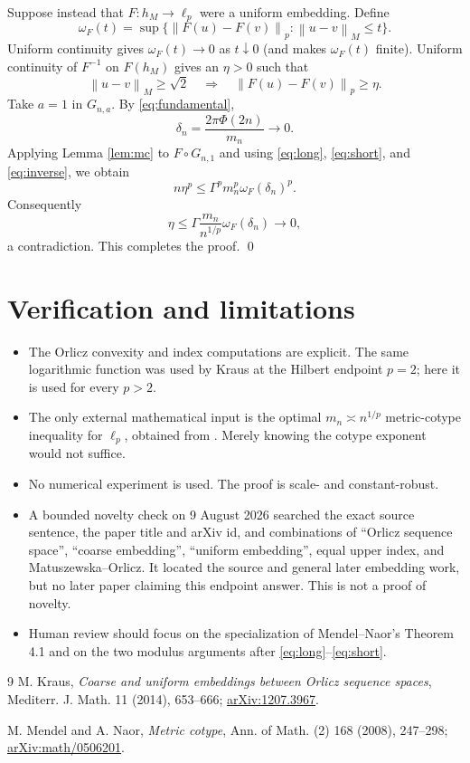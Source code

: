 \documentclass[11pt]{article}
\newcommand{\norm}[1]{\left\lVert #1\right\rVert}
\begin{document}
Suppose instead that $F:h_M\to\ell_p$ were a uniform embedding.  Define
\[
 \omega_F(t)=\sup\{\norm{F(u)-F(v)}_p:\norm{u-v}_M\le t\}.
\]
Uniform continuity gives $\omega_F(t)\to0$ as $t\downarrow0$ (and makes
$\omega_F(t)$ finite).  Uniform continuity of $F^{-1}$ on $F(h_M)$ gives an
$\eta>0$ such that
\begin{equation}\label{eq:inverse}
 \norm{u-v}_M\ge\sqrt2
 \quad\Longrightarrow\quad
 \norm{F(u)-F(v)}_p\ge\eta.
\end{equation}
Take $a=1$ in $G_{n,a}$.  By \eqref{eq:fundamental},
\[
 \delta_n=\frac{2\pi\Phi(2n)}{m_n}\longrightarrow0.
\]
Applying Lemma \ref{lem:mc} to $F\circ G_{n,1}$ and using
\eqref{eq:long}, \eqref{eq:short}, and \eqref{eq:inverse}, we obtain
\[
 n\eta^p\le \Gamma^p m_n^p\omega_F(\delta_n)^p.
\]
Consequently
\[
 \eta\le \Gamma\frac{m_n}{n^{1/p}}\omega_F(\delta_n)\longrightarrow0,
\]
a contradiction.  This completes the proof. \qed

\section{Verification and limitations}

\begin{itemize}
\item The Orlicz convexity and index computations are explicit.  The same
logarithmic function was used by Kraus at the Hilbert endpoint $p=2$; here it
is used for every $p>2$.
\item The only external mathematical input is the optimal $m_n\asymp n^{1/p}$
metric-cotype inequality for $\ell_p$, obtained from
\cite[Theorem 4.1]{MN}.  Merely knowing the cotype exponent would not suffice.
\item No numerical experiment is used.  The proof is scale- and
constant-robust.
\item A bounded novelty check on 9 August 2026 searched the exact source
sentence, the paper title and arXiv id, and combinations of ``Orlicz sequence
space'', ``coarse embedding'', ``uniform embedding'', equal upper index, and
Matuszewska--Orlicz.  It located the source and general later embedding work,
but no later paper claiming this endpoint answer.  This is not a proof of
novelty.
\item Human review should focus on the specialization of Mendel--Naor's
Theorem 4.1 and on the two modulus arguments after
\eqref{eq:long}--\eqref{eq:short}.
\end{itemize}

\begin{thebibliography}{9}
M. Kraus,
\emph{Coarse and uniform embeddings between Orlicz sequence spaces},
Mediterr. J. Math. 11 (2014), 653--666;
\href{https://arxiv.org/abs/1207.3967}{arXiv:1207.3967}.

M. Mendel and A. Naor,
\emph{Metric cotype},
Ann. of Math. (2) 168 (2008), 247--298;
\href{https://arxiv.org/abs/math/0506201}{arXiv:math/0506201}.
\end{thebibliography}
\end{document}

